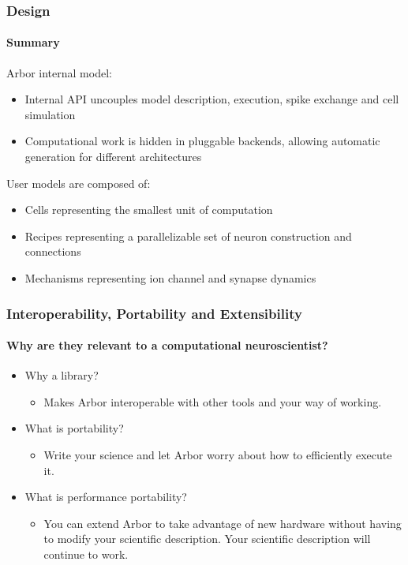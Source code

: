\documentclass[t]{beamer}
\begin{document}
\begin{frame}
    \frametitle{Design}
    \framesubtitle{Summary}

    Arbor internal model:
    \begin{itemize}
    \item Internal API uncouples model description, execution, spike exchange and cell simulation
    \item Computational work is hidden in pluggable backends, allowing automatic generation for different
architectures
    \end{itemize}

    User models are composed of:
    \begin{itemize}
    \item Cells representing the smallest unit of computation
    \item Recipes representing a parallelizable set of neuron construction and connections
    \item Mechanisms representing ion channel and synapse dynamics
    \end{itemize}
\end{frame}

\begin{frame}
    \frametitle{Interoperability, Portability and Extensibility}
    \framesubtitle{Why are they relevant to a computational neuroscientist?}
    \begin{itemize}
    \item Why a library?
    \begin{itemize}
    \item Makes Arbor interoperable with other tools and your way of working.
    \end{itemize}
    \item What is portability?
    \begin{itemize}
    \item Write your science and let Arbor worry about how to efficiently execute it.
    \end{itemize}
    \item What is performance portability?
    \begin{itemize}
    \item You can extend Arbor to take advantage of new hardware without having to modify your scientific description. Your scientific description will continue to work.
    \end{itemize}
    \end{itemize}
\end{frame}
\end{document}
